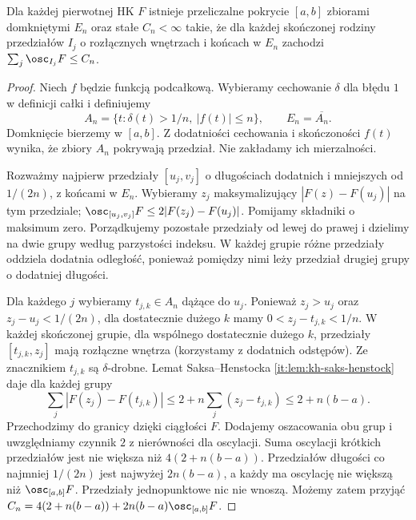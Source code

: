 \begin{lemat}
\label{ma1:kh:lem:kh-bvstar-cover}\label{it:lem:kh-bvstar-cover}
Dla każdej pierwotnej HK $F$ istnieje przeliczalne pokrycie $[a,b]$ zbiorami domkniętymi $E_n$ oraz stałe $C_n<\infty$ takie, że dla każdej skończonej rodziny przedziałów $I_j$ o rozłącznych wnętrzach i końcach w $E_n$ zachodzi $\sum_j\osc_{I_j}F\le C_n$.
\end{lemat}
\begin{proof}
Niech $f$ będzie funkcją podcałkową. Wybieramy cechowanie $\delta$ dla błędu $1$ w definicji całki i definiujemy
\[
 A_n=\{t:\delta(t)>1/n,\ |f(t)|\le n\},\qquad E_n=\overline{A_n}.
\]
Domknięcie bierzemy w $[a,b]$. Z dodatniości cechowania i skończoności $f(t)$ wynika, że zbiory $A_n$ pokrywają przedział. Nie zakładamy ich mierzalności.

Rozważmy najpierw przedziały $[u_j,v_j]$ o długościach dodatnich i mniejszych od $1/(2n)$, z końcami w $E_n$. Wybieramy $z_j$ maksymalizujący $|F(z)-F(u_j)|$ na tym przedziale; $\osc_{[u_j,v_j]}F\le2|F(z_j)-F(u_j)|$. Pomijamy składniki o maksimum zero. Porządkujemy pozostałe przedziały od lewej do prawej i dzielimy na dwie grupy według parzystości indeksu. W każdej grupie różne przedziały oddziela dodatnia odległość, ponieważ pomiędzy nimi leży przedział drugiej grupy o dodatniej długości.

Dla każdego $j$ wybieramy $t_{j,k}\in A_n$ dążące do $u_j$. Ponieważ $z_j>u_j$ oraz $z_j-u_j<1/(2n)$, dla dostatecznie dużego $k$ mamy $0<z_j-t_{j,k}<1/n$. W każdej skończonej grupie, dla wspólnego dostatecznie dużego $k$, przedziały $[t_{j,k},z_j]$ mają rozłączne wnętrza (korzystamy z dodatnich odstępów). Ze znacznikiem $t_{j,k}$ są $\delta$-drobne. Lemat Saksa--Henstocka \ref{it:lem:kh-saks-henstock} daje dla każdej grupy
\[
 \sum_j |F(z_j)-F(t_{j,k})|
 \le 2+n\sum_j(z_j-t_{j,k})\le2+n(b-a).
\]
Przechodzimy do granicy dzięki ciągłości $F$. Dodajemy oszacowania obu grup i uwzględniamy czynnik $2$ z nierówności dla oscylacji. Suma oscylacji krótkich przedziałów jest nie większa niż $4(2+n(b-a))$. Przedziałów długości co najmniej $1/(2n)$ jest najwyżej $2n(b-a)$, a każdy ma oscylację nie większą niż $\osc_{[a,b]}F$. Przedziały jednopunktowe nic nie wnoszą. Możemy zatem przyjąć $C_n=4(2+n(b-a))+2n(b-a)\osc_{[a,b]}F$.
\end{proof}

